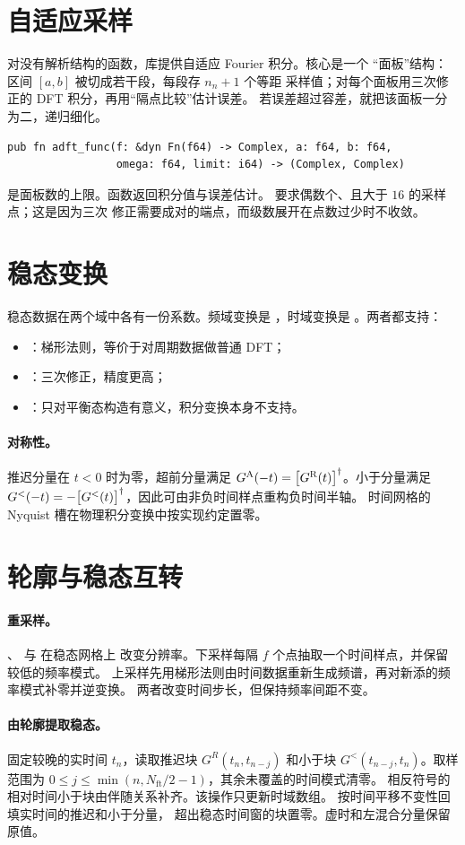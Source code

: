 \section{自适应采样}
\label{sec:adaptive}

对没有解析结构的函数，库提供自适应 Fourier 积分。核心是一个
“面板”结构：区间 $[a,b]$ 被切成若干段，每段存 $n_n+1$ 个等距
采样值；对每个面板用三次修正的 DFT 积分，再用“隔点比较”估计误差。
若误差超过容差，就把该面板一分为二，递归细化。

\begin{lstlisting}[numbers=none]
pub fn adft_func(f: &dyn Fn(f64) -> Complex, a: f64, b: f64,
                 omega: f64, limit: i64) -> (Complex, Complex)
\end{lstlisting}
 是面板数的上限。函数返回积分值与误差估计。
 要求偶数个、且大于 $16$ 的采样点；这是因为三次
修正需要成对的端点，而级数展开在点数过少时不收敛。

\section{稳态变换}
\label{sec:steady-transform}

稳态数据在两个域中各有一份系数。频域变换是
，时域变换是
。两者都支持：
\begin{itemize}
    \item {}：梯形法则，等价于对周期数据做普通 DFT；
    \item {}：三次修正，精度更高；
    \item {}：只对平衡态构造有意义，积分变换本身不支持。
\end{itemize}

\paragraph{对称性。}
推迟分量在 $t<0$ 时为零，超前分量满足
$G^{\mathrm{A}}(-t)=\big[G^{\mathrm{R}}(t)\big]^{\dagger}$。小于分量满足
$G^{<}(-t)=-\big[G^{<}(t)\big]^{\dagger}$，因此可由非负时间样点重构负时间半轴。
时间网格的 Nyquist 槽在物理积分变换中按实现约定置零。

\section{轮廓与稳态互转}
\label{sec:convert}

\paragraph{重采样。}
、 与  在稳态网格上
改变分辨率。下采样每隔 $f$ 个点抽取一个时间样点，并保留较低的频率模式。
上采样先用梯形法则由时间数据重新生成频谱，再对新添的频率模式补零并逆变换。
两者改变时间步长，但保持频率间距不变。

\paragraph{由轮廓提取稳态。}
 固定较晚的实时间 $t_n$，读取推迟块
$G^R(t_n,t_{n-j})$ 和小于块 $G^<(t_{n-j},t_n)$。取样范围为
$0\le j\le\min(n,N_{\mathrm{ft}}/2-1)$，其余未覆盖的时间模式清零。
相反符号的相对时间小于块由伴随关系补齐。该操作只更新时域数组。
 按时间平移不变性回填实时间的推迟和小于分量，
超出稳态时间窗的块置零。虚时和左混合分量保留原值。
